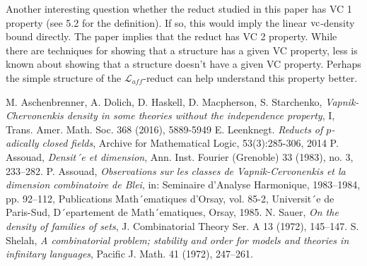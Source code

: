\documentclass{amsart}
\newcommand{\LLA}{\mathcal L_{aff}}
\begin{document}
Another interesting question whether the reduct studied in this paper has VC 1 property (see \cite{density} 5.2 for the definition).
If so, this would imply the linear $\operatorname{vc}$-density bound directly.
The paper \cite{density} implies that the reduct has VC 2 property.
While there are techniques for showing that a structure has a given VC property,
less is known about showing that a structure doesn't have a given VC property.
Perhaps the simple structure of the $\LLA$-reduct can help understand this property better.


\begin{thebibliography}{9}
  
  M. Aschenbrenner, A. Dolich, D. Haskell, D. Macpherson, S. Starchenko,
  \textit{Vapnik-Chervonenkis density in some theories without the independence property}, I,
  Trans. Amer. Math. Soc. 368 (2016), 5889-5949
  E. Leenknegt. \textit{Reducts of $p$-adically closed fields}, Archive for Mathematical Logic, 53(3):285-306, 2014
  P. Assouad, \textit{Densit´e et dimension}, Ann. Inst. Fourier (Grenoble) 33 (1983), no. 3, 233–282.
  P. Assouad, \textit{Observations sur les classes de Vapnik-Cervonenkis et la dimension combinatoire de Blei},
  in: Seminaire d’Analyse Harmonique, 1983–1984, pp. 92–112, Publications Math´ematiques
  d’Orsay, vol. 85-2, Universit´e de Paris-Sud, D´epartement de Math´ematiques, Orsay, 1985.
  N. Sauer, \textit{On the density of families of sets}, J. Combinatorial Theory Ser. A 13 (1972), 145–147.
  S. Shelah, \textit{A combinatorial problem; stability and order for models and theories in infinitary languages},
  Pacific J. Math. 41 (1972), 247–261.
\end{thebibliography}
\end{document}
